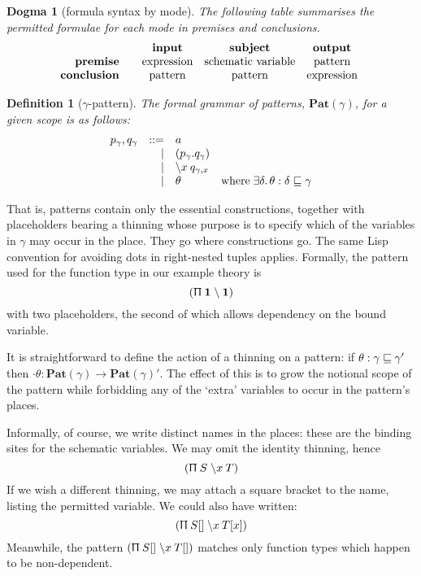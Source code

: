 \documentclass{jfp1}
\newtheorem{definition}[theorem]{Definition}
\newtheorem{dogma}[theorem]{Dogma}
\begin{document}
\begin{dogma}[\label{dogma:mode}formula syntax by mode]
  The following table summarises the permitted formulae for each mode in premises
  and conclusions.
  \[\mbox{\begin{tabular}{r@{~ ~}@{~ ~}c@{~ ~}c@{~ ~}c}
                    & \textbf{input} & \textbf{subject} & \textbf{output} \\
            \textbf{premise}  & expression & schematic variable & pattern \\
     \textbf{conclusion} & pattern & pattern & expression \\
          \end{tabular} }\]
\end{dogma}

\newcommand{\Pat}[1]{\textbf{Pat}(#1)}
\begin{definition}[$\gamma$-pattern]
The formal grammar of patterns, $\Pat\gamma$, for a given scope is as follows:
\[\begin{array}{rrl@{\quad}l}
    p_\gamma, q_\gamma & ::= & a \\
         &   | & (p_\gamma.q_\gamma) \\
         &   | & \la x q_{\gamma,x} \\
         &   | & \theta & \mbox{where}\;\exists\delta.\,\theta : \delta\thin\gamma
\end{array}\]
\end{definition}

That is, patterns contain only the essential constructions, together with
placeholders bearing a thinning whose purpose is to specify which of
the variables in $\gamma$ may occur in the place. They go where constructions
go. The same Lisp convention for avoiding dots in right-nested tuples applies.
Formally, the pattern used for the function type in our example theory is
\[
  (\Uppi\:\mathbf{1}\;\backslash \:{\mathbf{1}})
\]
with two placeholders, the second of which allows dependency on the bound variable.

It is straightforward to define the action of a thinning on a pattern: if
$\theta : \gamma\sqsubseteq\gamma'$ then $\cdot\theta : \Pat\gamma\to\Pat\gamma'$.
The effect of this is to grow the notional scope of the pattern while
forbidding any of the `extra' variables to occur in the pattern's places.

Informally, of course, we write distinct names in the places: these are the
binding sites for the schematic variables. We may omit the identity thinning,
hence
\[
  (\Uppi\:S\;\backslash x\:{T})
\]
If we wish a different thinning, we may attach a square bracket to the name,
listing the permitted variable. We could also have written:
\[
  (\Uppi\:S[]\;\backslash x\:{T[x]})
\]
Meanwhile, the pattern $(\Uppi\:S[]\;\backslash x\:{T[]})$ matches only function types which
happen to be non-dependent.
\end{document}
